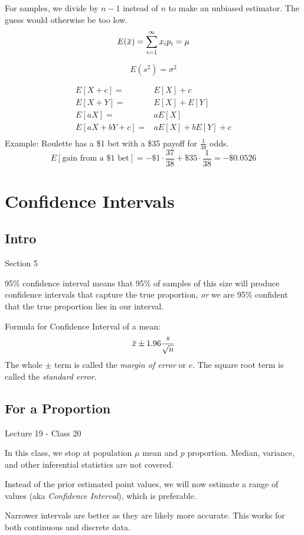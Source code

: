 \documentclass[11pt, oneside]{article}   	%
\newcommand{\overbar}[1]{\mkern 1.5mu\overline{\mkern-1.5mu#1\mkern-1.5mu}\mkern 1.5mu}
\begin{document}
For samples, we divide by $n-1$ instead of $n$ to make an unbiased estimator. The guess would otherwise be too low.
\[
E(\overbar{x}) = \sum\limits_{i=1}^{\infty} x_i p_i = \mu
\]

\[
E(s^2) = \sigma^2
\]

\begin{align*}
E[X + c] =& E[X] + c\\
E[X + Y] =& E[X] + E[Y]\\
E[aX] =& a E[X]\\
E[aX + bY + c] =& aE[X] + bE[Y] +c\\
\end{align*}
Example: Roulette has a \$1 bet with a \$35 payoff for $\frac{1}{38}$ odds.
\[
E[\text{gain from a \$1 bet}] = -\$1 \cdot \frac{37}{38} + \$35 \cdot \frac{1}{38} = -\$0.0526
\]

\section{Confidence Intervals}
\subsection{Intro}
Section 5

95\% confidence interval means that 95\% of samples of this size will produce confidence intervals that capture the true proportion, \textit{or} we are 95\% confident that the true proportion lies in our interval.

Formula for Confidence Interval of a mean:
\[
\overbar{x} \pm 1.96 \frac{s}{\sqrt{n}}
\]
The whole $\pm$ term is called the \textit{margin of error} or $e$. The square root term is called the \textit{standard error}.

\subsection{For a Proportion}

Lecture 19 - Class 20

In this class, we stop at population $\mu$ mean and $p$ proportion. Median, variance, and other inferential statistics are not covered.

Instead of the prior estimated point values, we will now estimate a range of values (aka \textit{Confidence Interval}), which is preferable.

Narrower intervals are better as they are likely more accurate. This works for both continuous and discrete data. 
\end{document}

